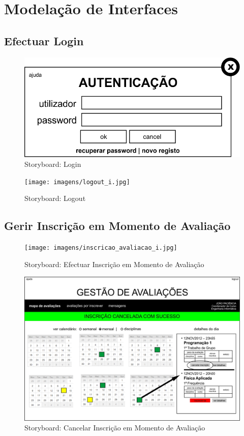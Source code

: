 \chapter{Modelação de Interfaces}

\section{Efectuar Login}
\begin{figure}[!htbp]
\centering
\includegraphics{imagens/login_i.jpg}
\caption{Storyboard: Login}
\label{fig:login_i}
\end{figure}

\begin{figure}[!htbp]
\centering
\texttt{[image: imagens/logout\_i.jpg]}
\caption{Storyboard: Logout}
\label{fig:logout_i}
\end{figure}

\clearpage
\section{Gerir Inscrição em Momento de Avaliação}

\begin{figure}[!htbp]
\centering
\texttt{[image: imagens/inscricao\_avaliacao\_i.jpg]}
\caption{Storyboard: Efectuar Inscrição em Momento de Avaliação}
\label{fig:inscricao_avaliacao_i}
\end{figure}

\begin{figure}[!htbp]
\centering
\includegraphics{imagens/cancelar_inscricao_i.jpg}
\caption{Storyboard: Cancelar Inscrição em Momento de Avaliação}
\label{fig:cancelar_inscricao_i}
\end{figure}




